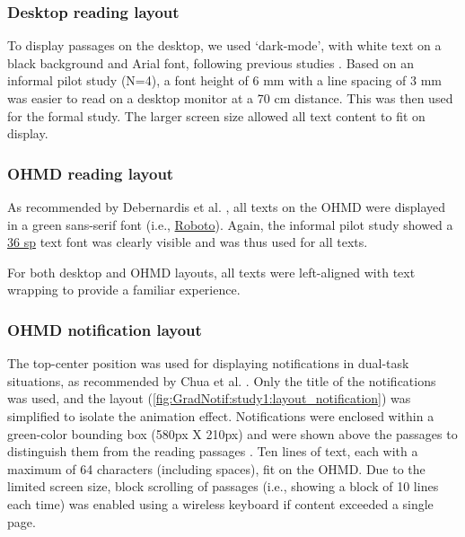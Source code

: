 \subsubsection*{Desktop reading layout}

To display passages on the desktop, we used `dark-mode', with white text on a black background and Arial font, following previous studies \cite{jankowski_integrating_2010, bernard_comparing_2003, buchner_advantage_2009}. Based on an informal pilot study (N=4), a font height of 6 mm with a line spacing of 3 mm was easier to read on a desktop monitor at a 70 cm distance. This was then used for the formal study. The larger screen size allowed all text content to fit on display.



\subsubsection*{OHMD reading layout}

As recommended by Debernardis et al. \cite{debernardis_text_2014}, all texts on the OHMD were displayed in a green sans-serif font (i.e., \href{https://fonts.google.com/specimen/Roboto}{Roboto}). Again, the informal pilot study showed a \href{https://developer.android.com/training/multiscreen/screendensities}{36 sp} text font was clearly visible and was thus used for all texts. 

For both desktop and OHMD layouts, all texts were left-aligned with text wrapping to provide a familiar experience.


\subsubsection*{OHMD notification layout}

The top-center position was used for displaying notifications in dual-task situations, as recommended by Chua et al. \cite{chua_positioning_2016}. Only the title of the notifications \cite{android_android_2021} was used, and the layout (\autoref{fig:GradNotif:study1:layout_notification}) was simplified to isolate the animation effect. Notifications were enclosed within a green-color bounding box (580px X 210px) and were shown above the passages to distinguish them from the reading passages \cite{android_android_2021}. Ten lines of text, each with a maximum of 64 characters (including spaces), fit on the OHMD. Due to the limited screen size, block scrolling of passages (i.e., showing a block of 10 lines each time) \cite{ghosh_eyeditor_2020} was enabled using a wireless keyboard if content exceeded a single page.


